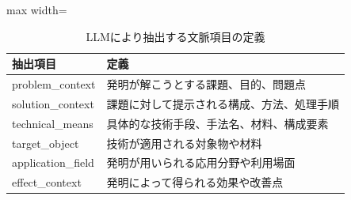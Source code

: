 \begin{table}[tbp]
\centering
\small
\caption{LLMにより抽出する文脈項目の定義}
\label{tab:extraction_fields_table}
\begin{adjustbox}{max width=\textwidth}
\begin{tabular}{ll}
\toprule
抽出項目 & 定義 \\
\midrule
problem\_context & 発明が解こうとする課題、目的、問題点 \\
solution\_context & 課題に対して提示される構成、方法、処理手順 \\
technical\_means & 具体的な技術手段、手法名、材料、構成要素 \\
target\_object & 技術が適用される対象物や材料 \\
application\_field & 発明が用いられる応用分野や利用場面 \\
effect\_context & 発明によって得られる効果や改善点 \\
\bottomrule
\end{tabular}
\end{adjustbox}
\end{table}
